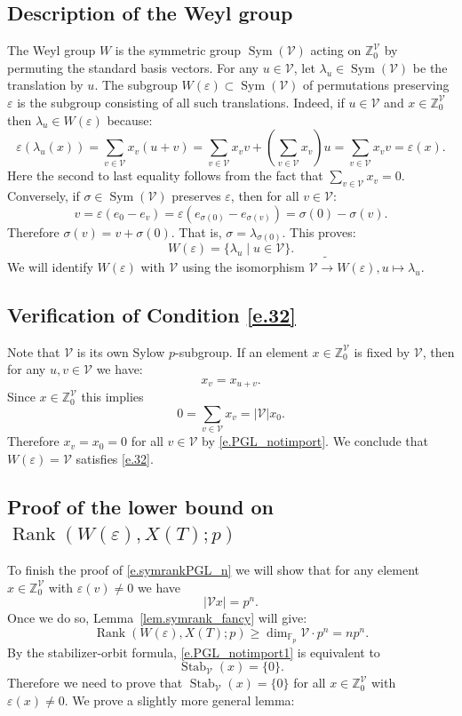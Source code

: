 \documentclass[12pt]{amsart}
\numberwithin{equation}{section}
\theoremstyle{definition}
\newcommand{\cV}{\mathcal{V}}
\newcommand{\bF}{\mathbb{F}}
\newcommand{\bZ}{\mathbb{Z}}
\newcommand{\Sym}{\operatorname{Sym}}
\newcommand{\SymRank}{\operatorname{Rank}}
\newcommand{\Stab}{\operatorname{Stab}}
\newcommand{\eps}{\varepsilon}
\begin{document}
\subsection*{Description of the Weyl group}
    The Weyl group  $W$ is the symmetric group $\Sym(\cV)$ acting on $\bZ^\cV_0$ by permuting the standard basis vectors. For any $u\in \cV$, let $\lambda_u\in \Sym(\cV)$ be the translation by $u$. The subgroup $W(\eps)\subset \Sym(\cV)$ of permutations preserving $\eps$ is the subgroup consisting of all such translations. Indeed, if $u\in \cV$ and $x \in \bZ^\cV_0$ then $\lambda_u\in W(\eps)$ because:
    $$\eps( \lambda_u(x) ) = \sum_{v\in \cV} x_{v} (u+v) = \sum_{v\in \cV} x_v v + (\sum_{v\in \cV} x_v) u = \sum_{v\in \cV} x_v v = \eps(x).$$
    Here the second to last equality follows from the fact that $\sum_{v\in \cV} x_v = 0$.
    Conversely, if $\sigma \in \Sym(\cV)$ preserves $\eps$, then for all $v\in \cV$:
    $$v = \eps(e_0 - e_v) =\eps(e_{\sigma(0)} - e_{\sigma(v)}) = \sigma(0)- \sigma(v).$$
    Therefore $\sigma(v) = v+ \sigma(0)$. That is, $\sigma = \lambda_{\sigma(0)}$. This proves:
    $$W(\eps)= \{ \lambda_u \mid u\in \cV\}.$$
    We will identify $W(\eps)$ with $\cV$ using the isomorphism $\cV\tilde{\to} W(\eps), u\mapsto \lambda_u$.
    
\subsection*{Verification of Condition \eqref{e.32}}
    Note that $\cV$ is its own Sylow $p$-subgroup. If an element $x \in \bZ^\cV_0$ is fixed by $\cV$, then for any $u,v\in \cV$ we have:
    \begin{equation}\label{e.PGL_notimport}
        x_{v} = x_{u+v}.
    \end{equation}
    Since $x\in \bZ^\cV_0$ this implies $$0 = \sum_{v\in \cV} x_v  = |\cV| x_0.$$
    Therefore $x_v =x_0 =0$ for all $v\in \cV$ by \eqref{e.PGL_notimport}. We conclude that $W(\eps)= \cV$ satisfies \eqref{e.32}.

 \subsection*{Proof of the lower bound on \texorpdfstring{$\SymRank(W(\eps),X(T);p)$}{the symmetric rank}}
    To finish the proof of \eqref{e.symrankPGL_n} we will show that for any element $x\in \bZ^\cV_0$ with $\eps(v)\neq 0$ we have
    \begin{equation}\label{e.PGL_notimport1}
        |\cV x|= p^n.
    \end{equation} 
    Once we do so, Lemma~\ref{lem.symrank_fancy} will give:
    $$\SymRank(W(\eps),X(T);p) \geq \dim_{\bF_p}\cV \cdot p^n = n p^n.$$
    By the stabilizer-orbit formula, \eqref{e.PGL_notimport1} is equivalent to
    $$\Stab_{\cV}(x) = \{0\}.$$
    Therefore we need to prove that $\Stab_{\cV}(x)=\{0\}$ for all $x\in \bZ^{\cV}_0$ with $\eps(x)\neq 0$.
    We prove a slightly more general lemma:
    
\end{document}
